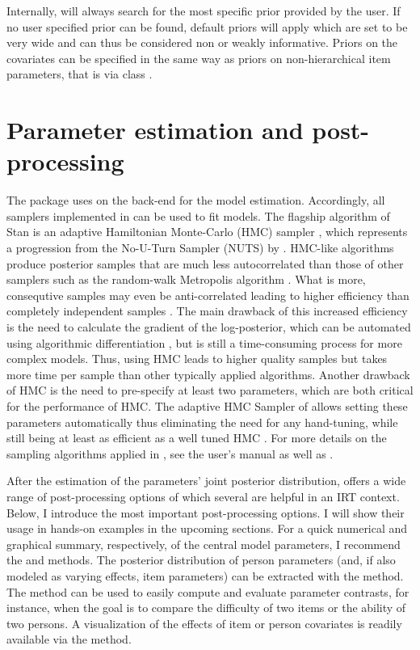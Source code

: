 \documentclass[jss]{jss}
\begin{document}
Internally,  will always search for the most specific prior
provided by the user. If no user specified prior can be found, default
priors will apply which are set to be very wide and can thus be
considered non or weakly informative. Priors on the covariates can be
specified in the same way as priors on non-hierarchical item parameters,
that is via class .

\hypertarget{estimation}{%
\section{Parameter estimation and post-processing}\label{estimation}}

The  package uses  \citep{carpenter2017} on the
back-end for the model estimation. Accordingly, all samplers implemented
in  can be used to fit  models. The flagship
algorithm of Stan is an adaptive Hamiltonian Monte-Carlo (HMC) sampler
\citep{betancourt2014, betancourt2017, stanM2019}, which represents a
progression from the No-U-Turn Sampler (NUTS) by \citet{hoffman2014}.
HMC-like algorithms produce posterior samples that are much less
autocorrelated than those of other samplers such as the random-walk
Metropolis algorithm \citep{hoffman2014, creutz1988}. What is more,
consequtive samples may even be anti-correlated leading to higher
efficiency than completely independent samples \citep{vehtari2019}. The
main drawback of this increased efficiency is the need to calculate the
gradient of the log-posterior, which can be automated using algorithmic
differentiation \citep{griewank2008}, but is still a time-consuming
process for more complex models. Thus, using HMC leads to higher quality
samples but takes more time per sample than other typically applied
algorithms. Another drawback of HMC is the need to pre-specify at least
two parameters, which are both critical for the performance of HMC. The
adaptive HMC Sampler of  allows setting these parameters
automatically thus eliminating the need for any hand-tuning, while still
being at least as efficient as a well tuned HMC \citep{hoffman2014}. For
more details on the sampling algorithms applied in , see
the  user's manual \citep{stanM2019} as well as
\citet{hoffman2014}.

After the estimation of the parameters' joint posterior distribution,
 offers a wide range of post-processing options of which
several are helpful in an IRT context. Below, I introduce the most
important post-processing options. I will show their usage in hands-on
examples in the upcoming sections. For a quick numerical and graphical
summary, respectively, of the central model parameters, I recommend the
 and  methods. The posterior distribution of
person parameters (and, if also modeled as varying effects, item
parameters) can be extracted with the  method. The
 method can be used to easily compute and evaluate
parameter contrasts, for instance, when the goal is to compare the
difficulty of two items or the ability of two persons. A visualization
of the effects of item or person covariates is readily available via the
 method.
\end{document}
